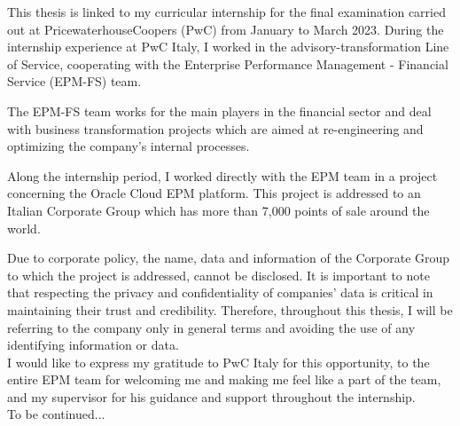 \documentclass[12pt,a4paper,openright,twoside]{book}
\begin{document}
	
\frontmatter



\begin{acknowledgements}

This thesis is linked to my curricular internship for the final examination carried out at PricewaterhouseCoopers (PwC) from January to March 2023.
%
During the internship experience at PwC Italy, I worked in the advisory-transformation Line of Service, cooperating with the Enterprise Performance Management - Financial Service (EPM-FS) team.

The EPM-FS team works for the main players in the financial sector and deal with business transformation projects which are aimed at re-engineering and optimizing the company's internal processes.

Along the internship period, I worked directly with the EPM team in a project concerning the Oracle Cloud EPM platform.
%
This project is addressed to an Italian Corporate Group which has more than 7,000 points of sale around the world. 

Due to corporate policy, the name, data and information of the Corporate Group to which the project is addressed, cannot be disclosed. 
%
It is important to note that respecting the privacy and confidentiality of companies' data is critical in maintaining their trust and credibility.
%
Therefore, throughout this thesis, I will be referring to the company only in general terms and avoiding the use of any identifying information or data. \\

I would like to express my gratitude to PwC Italy for this opportunity, to the entire EPM team for welcoming me and making me feel like a part of the team, and my supervisor for his guidance and support throughout the internship. \\

To be continued...

\end{acknowledgements}
\end{document}

